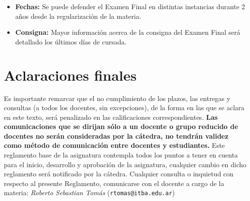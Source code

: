 \documentclass[10pt]{article}
\begin{document}
\begin{itemize}
    \item \textbf{Fechas: } Se puede defender el Examen Final en distintas instancias durante 2 años desde la regularización de la materia.
    
    \item \textbf{Consigna: } Mayor información acerca de la consigna del Examen Final será detallado los últimos días de cursada.
    
\end{itemize}

\section{Aclaraciones finales}

Es importante remarcar que el no cumplimiento de los plazos, las entregas y consultas (a todos los docentes, sin excepciones), de la forma en las que se aclara en este texto, será penalizado en las calificaciones correspondientes. \textbf{Las comunicaciones que se dirijan sólo a un docente o grupo reducido de docentes no serán consideradas por la cátedra, no tendrán validez como método de comunicación entre docentes y estudiantes.} Este reglamento base de la asignatura contempla todos los puntos a tener en cuenta para el inicio, desarrollo y aprobación de la asignatura, cualquier cambio en dicho reglamento será notificado por la cátedra. Cualquier consulta o inquietud con respecto al presente Reglamento, comunicarse con el docente a cargo de la materia: \textit{Roberto Sebastian Tomás} (\texttt{rtomas@itba.edu.ar})
\end{document}

